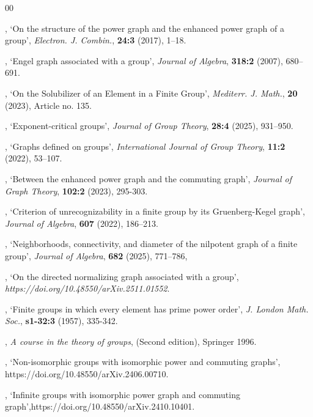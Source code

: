 \begin{thebibliography}{00}

, {`On the structure of the power graph
and the enhanced power graph of a group'}, {\it Electron. J. Combin.}, {\bf 24:3} (2017), 1--18.

, {`Engel graph associated with a group'}, {\it Journal of Algebra}, {\bf 318:2} (2007), 680--691.

, {`On the Solubilizer of an Element in a Finite Group'}, {\it Mediterr. J. Math.}, {\bf 20} (2023), Article no. 135.

, {`Exponent-critical groups'}, {\it Journal of Group Theory}, {\bf 28:4} (2025), 931--950.

, {`Graphs defined on groups'}, {\it International Journal of Group Theory}, {\bf 11:2} (2022), 53--107. 

, {`Between the enhanced power graph and the commuting graph'}, {\it Journal of Graph Theory}, {\bf 102:2} (2023), 295-303.

, {`Criterion of unrecognizability in a finite group by its Gruenberg-Kegel graph'}, {\it Journal of Algebra}, {\bf 607} (2022), 186--213.

, {`Neighborhoods, connectivity, and diameter of the nilpotent graph of a finite group'}, {\it Journal of Algebra}, {\bf 682} (2025), 771--786,

, {`On the directed normalizing graph associated with a group'}, {\it https://doi.org/10.48550/arXiv.2511.01552}.


, {`Finite groups in which every element has prime power order'}, {\it J. London Math. Soc.}, {\bf s1-32:3} (1957), 335-342.

, {\it A course in the theory of groups}, (Second edition), Springer 1996. 


, {`Non-isomorphic groups with isomorphic power and commuting graphs'}, {https://doi.org/10.48550/arXiv.2406.00710}.

, {`Infinite groups with isomorphic power graph and commuting graph'},{https://doi.org/10.48550/arXiv.2410.10401}.



\end{thebibliography}



